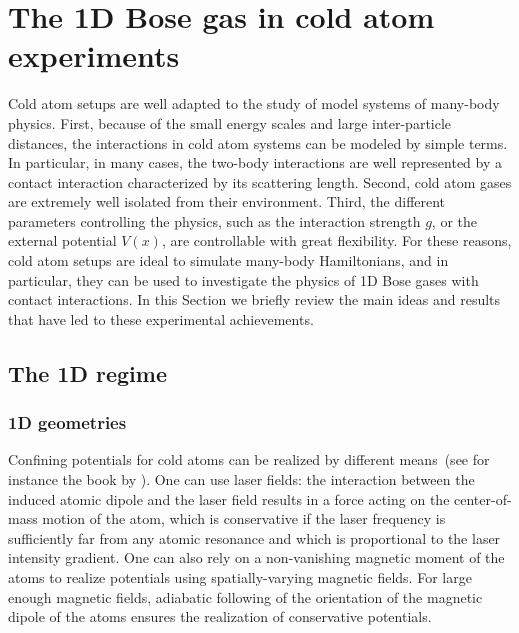\documentclass[onecolumn,amsfonts,showpacs,superscriptaddress]{revtex4-1}
\begin{document}
\newpage

\section{The 1D Bose gas in cold atom experiments}
\label{sec:experiments_beforeGHD}
Cold atom setups are well adapted to the study of model systems of
many-body physics. First, because of the small energy scales and large
inter-particle distances, the interactions in cold atom systems can be
modeled by simple terms. In particular, in many cases, the two-body interactions are
well represented by a contact interaction characterized
by its scattering length. Second, cold atom gases are extremely well isolated from their environment. Third, the different parameters controlling the physics, such as the interaction strength $g$, or the external potential $V(x)$, are controllable with great flexibility. For  these reasons, cold atom setups are ideal to simulate many-body Hamiltonians, and in particular, they can be used to investigate the physics of 1D Bose gases with contact interactions. In this Section we briefly review the main ideas and results that have led to these experimental achievements.

\subsection{The 1D regime}

\subsubsection{1D geometries}

Confining potentials for cold atoms can be realized by different
means~(see for instance the book by \cite{pethick_boseeinstein_2008}). One can use laser fields: the interaction
between the induced atomic dipole and the laser field results in a force acting on the center-of-mass motion of the atom, which is conservative if the laser frequency is sufficiently far from
any atomic resonance and which is proportional to the laser intensity gradient.
One can also rely on a non-vanishing  magnetic moment of the atoms to 
realize potentials using spatially-varying magnetic fields. For large
enough magnetic fields, adiabatic
following of the orientation of the magnetic dipole of the atoms ensures the realization of conservative potentials. 
\end{document}
